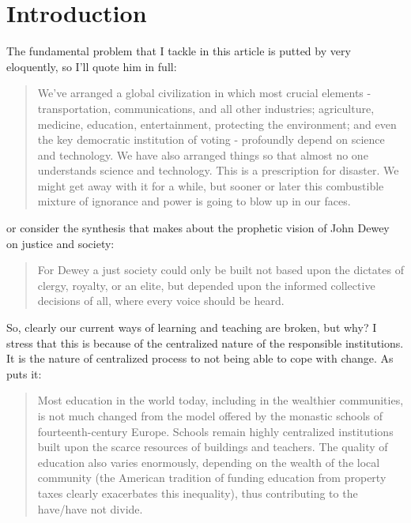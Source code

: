 \section{Introduction}

The fundamental problem that I tackle in this article is putted by \cite{sagan_1996__candle_in_dark}  
very eloquently, so I'll quote him in full:

\begin{quotation}
    We've arranged a global civilization in which most crucial elements -
    transportation, communications, and all other industries; agriculture,
    medicine, education, entertainment, protecting the environment; and even
    the key democratic institution of voting - profoundly depend on science and
    technology. We have also arranged things so that almost no one understands
    science and technology. This is a prescription for disaster. We might get
    away with it for a while, but sooner or later this combustible mixture of
    ignorance and power is going to blow up in our faces.
\end{quotation}

or consider the synthesis that \cite{education:cavallo__models_of_growth} makes
about the prophetic vision of John Dewey on justice and society:

\begin{quote}
    For Dewey a just society could only be built not based upon the dictates of
    clergy, royalty, or an elite, but depended upon the informed collective
    decisions of all, where every voice should be heard.
\end{quote}

So, clearly our current ways of learning and teaching are broken, but why? I
stress that this is because of the centralized nature of the responsible
institutions. It is the nature of centralized process to not being able to cope
with change. As \cite{futurism:kurzweil_singularity_is_near} puts it:

\begin{quotation}
    Most education in the world today, including in the wealthier communities,
    is not much changed from the model offered by the monastic schools of
    fourteenth-century Europe. Schools remain highly centralized institutions
    built upon the scarce resources of buildings and teachers. The quality of
    education also varies enormously, depending on the wealth of the local
    community (the American tradition of funding education from property taxes
    clearly exacerbates this inequality), thus contributing to the have/have not
    divide.
\end{quotation}

